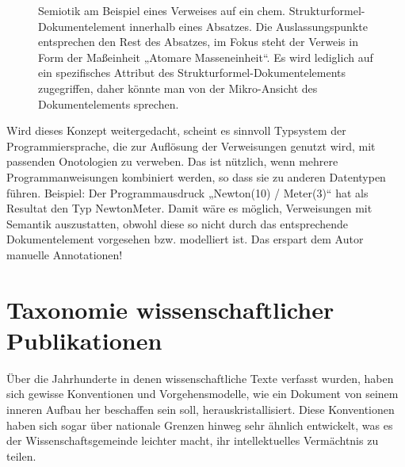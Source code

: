  
\begin{figure}[h!]
\centering
\advance\leftskip-2.5cm
\caption[Semiotik der Mikro-Ansicht eines Dokumentelements]{ Semiotik am Beispiel eines Verweises auf ein chem. Strukturformel-Dokumentelement innerhalb eines Absatzes. Die Auslassungspunkte entsprechen den Rest des Absatzes, im Fokus steht der Verweis in Form der Maßeinheit „Atomare Masseneinheit“. Es wird lediglich auf ein spezifisches Attribut des Strukturformel-Dokumentelements zugegriffen, daher könnte man von der Mikro-Ansicht des Dokumentelements sprechen. }\label{semiotikmikro}
\end{figure}
 
Wird dieses Konzept weitergedacht, scheint es sinnvoll Typsystem der Programmiersprache, die zur Auflösung der Verweisungen genutzt wird, mit passenden Onotologien zu verweben. Das ist nützlich, wenn mehrere Programmanweisungen kombiniert werden, so dass sie zu anderen Datentypen führen. Beispiel: Der Programmausdruck „Newton(10) / Meter(3)“ hat als Resultat den Typ NewtonMeter. Damit wäre es möglich, Verweisungen mit Semantik auszustatten, obwohl diese so nicht durch das entsprechende Dokumentelement vorgesehen bzw. modelliert ist. Das erspart dem Autor manuelle Annotationen!

 
\section{Taxonomie wissenschaftlicher Publikationen}\label{taxonomie-sec}
 
Über die Jahrhunderte in denen wissenschaftliche Texte verfasst wurden, haben sich gewisse Konventionen und Vorgehensmodelle, wie ein Dokument von seinem inneren Aufbau her beschaffen sein soll, herauskristallisiert. Diese Konventionen haben sich sogar über nationale Grenzen hinweg sehr ähnlich entwickelt, was es der Wissenschaftsgemeinde leichter macht, ihr intellektuelles Vermächtnis zu teilen.

